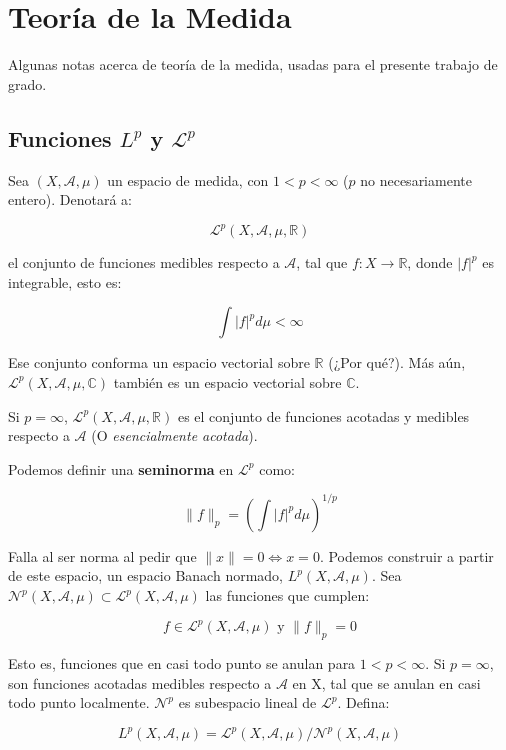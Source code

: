 \section{Teoría de la Medida}

Algunas notas acerca de teoría de la medida, usadas para el presente trabajo de grado.

\subsection{Funciones $L^p$ y $\mathcal{L}^p$}

Sea $(X, \mathcal{A}, \mu)$ un espacio de medida, con $1 < p < \infty$ ($p$ no necesariamente entero). Denotará a:

\[
	\mathcal{L}^p (X, \mathcal{A}, \mu, \mathbb{R})
\]

el conjunto de funciones medibles respecto a $\mathcal{A}$, tal que $f: X \rightarrow \mathbb{R}$, donde $\lvert f \rvert^p$ es integrable, esto es:

\[
	\int \lvert f \rvert^p d\mu < \infty
\]

Ese conjunto conforma un espacio vectorial sobre $\mathbb{R}$ (¿Por qué?). Más aún, $\mathcal{L}^p (X, \mathcal{A}, \mu, \mathbb{C})$ también es un espacio vectorial sobre $\mathbb{C}$.

Si $p = \infty$, $\mathcal{L}^p (X, \mathcal{A}, \mu, \mathbb{R})$ es el conjunto de funciones acotadas y medibles respecto a $\mathcal{A}$ (O \textit{esencialmente acotada}).

Podemos definir una \textbf{seminorma} en $\mathcal{L}^p$ como:

\[
	\lVert f \rVert_p = \left( \int \lvert f \rvert^p d\mu \right)^{1/p}
\]

Falla al ser norma al pedir que $\lVert x \rVert = 0 \Leftrightarrow x = 0$. Podemos construir a partir de este espacio, un espacio Banach normado, $L^p (X, \mathcal{A}, \mu)$. Sea $\mathcal{N}^p (X, \mathcal{A}, \mu) \subset \mathcal{L}^p (X, \mathcal{A}, \mu)$ las funciones que cumplen:

\[
	f \in \mathcal{L}^p (X, \mathcal{A}, \mu) \text{ y } \lVert f \rVert_p = 0
\] 

Esto es, funciones que en casi todo punto se anulan para $1 < p < \infty$. Si $p = \infty$, son funciones acotadas medibles respecto a $\mathcal{A}$ en X, tal que se anulan en casi todo punto localmente. $\mathcal{N}^p$ es subespacio lineal de $\mathcal{L}^p$. Defina:

\[
	L^p (X, \mathcal{A}, \mu) = \mathcal{L}^p (X, \mathcal{A}, \mu) / \mathcal{N}^p (X, \mathcal{A}, \mu)
\]

